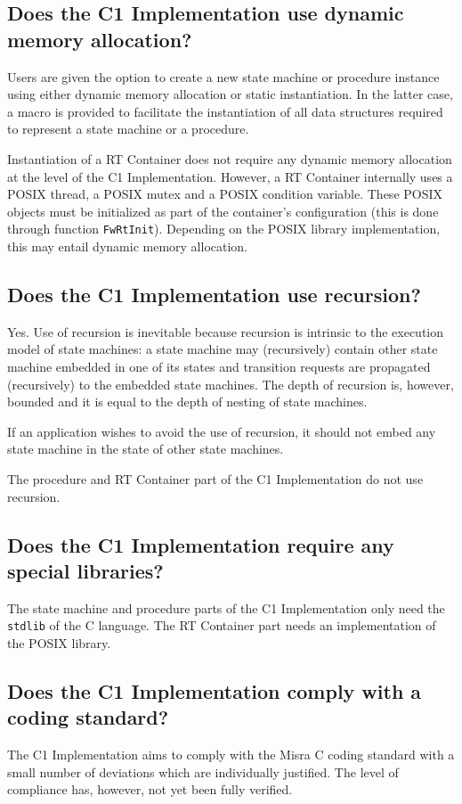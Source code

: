 \documentclass[faq]{../fwprofile}
\begin{document}
\subsection{Does the C1 Implementation use dynamic memory allocation?}
Users are given the option to create a new state machine or procedure instance using either dynamic memory allocation or static instantiation. In the latter case, a macro is provided to facilitate the instantiation of all data structures required to represent a state machine or a procedure.

Instantiation of a RT Container does not require any dynamic memory allocation at the level of the C1 Implementation. However, a RT Container internally uses a POSIX thread, a POSIX mutex and a POSIX condition variable. These POSIX objects must be initialized as part of the container's configuration (this is done through function \texttt{FwRtInit}). Depending on the POSIX library implementation, this may entail dynamic memory allocation.

\subsection{Does the C1 Implementation use recursion?}
Yes. Use of recursion is inevitable because recursion is intrinsic to the execution model of state machines: a state machine may (recursively) 
contain other state machine embedded in one of its states and transition requests are propagated (recursively) to the embedded state machines. 
The depth of recursion is, however, bounded and it is equal to the depth of nesting of state machines.

If an application wishes to avoid the use of recursion, it should not embed any state machine in the state of other state machines.  

The procedure and RT Container part of the C1 Implementation do not use recursion.

\subsection{Does the C1 Implementation require any special libraries?}
The state machine and procedure parts of the C1 Implementation only need the \texttt{stdlib} of the C language. The RT Container part needs an implementation of the POSIX library. 

\subsection{Does the C1 Implementation comply with a coding standard?}
The C1 Implementation aims to comply with the Misra C coding standard with a small number of deviations which are individually justified. 
The level of compliance has, however, not yet been fully verified.
\end{document}
